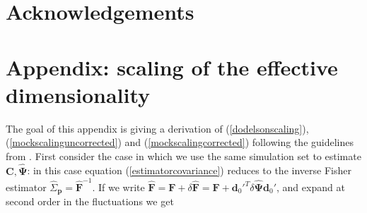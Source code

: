 \documentclass[reprint,aps,prd,superscriptaddress,showkeys,showpacs]{revtex4-1}
\newcommand{\bb}[1]{\mathbf{#1}}
\newcommand{\bbh}[1]{\mathbf{\hat{#1}}}
\newcommand{\h}[1]{\hat{#1}}
\begin{document}
 

\section*{Acknowledgements}




\section*{Appendix: scaling of the effective dimensionality}
\label{appendix}

The goal of this appendix is giving a derivation of (\ref{dodelsonscaling}),(\ref{mockscalinguncorrected}) and (\ref{mockscalingcorrected}) following the guidelines from \citep{DodelsonSchneider13,Taylor12}. First consider the case in which we use the same simulation set to estimate $\bb{C},\bbh{\Psi}$: in this case equation (\ref{estimatorcovariance}) reduces to the inverse Fisher estimator $\h{\Sigma}_\bb{p}=\bbh{F}^{-1}$. If we write $\bbh{F}=\bb{F}+\delta\bbh{F}=\bb{F}+\bb{d}_0'^T\delta\bbh{\Psi}\bb{d}_0'$, and expand at second order in the fluctuations we get
\end{document}

